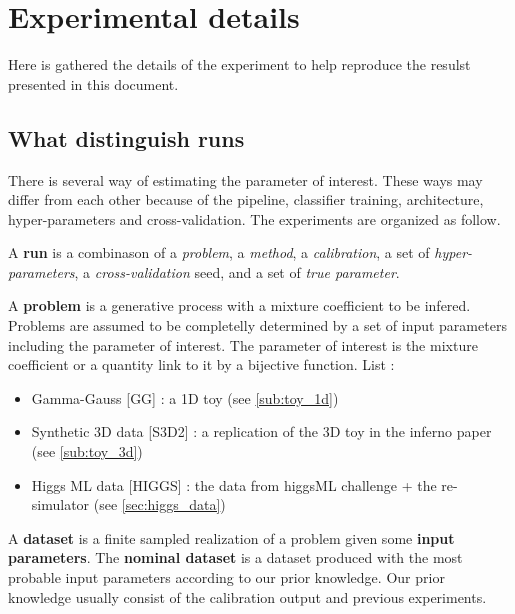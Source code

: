 \ifpdf
    \graphicspath{{Appendix1/Figs/Raster/}{Appendix1/Figs/PDF/}{Appendix1/Figs/}}
\else
    \graphicspath{{Appendix1/Figs/Vector/}{Appendix1/Figs/}}
\fi

\chapter{Experimental details} 


Here is gathered the details of the experiment to help reproduce the resulst presented in this document.








\section{What distinguish runs} %
\label{sec:what_distinguish_runs}

There is several way of estimating the parameter of interest.
These ways may differ from each other because of the pipeline, classifier training, architecture, hyper-parameters and cross-validation.
The experiments are organized as follow.

A \textbf{run} is a combinason of a \emph{problem}, a \emph{method}, a \emph{calibration}, a set of \emph{hyper-parameters}, a \emph{cross-validation} seed, and a set of \emph{true parameter}.

A \textbf{problem} is a generative process with a mixture coefficient to be infered.
Problems are assumed to be completelly determined by a set of input parameters including the parameter of interest.
The parameter of interest is the mixture coefficient or a quantity link to it by a bijective function.
List :
\begin{itemize}
	\item Gamma-Gauss [GG] : a 1D toy (see \autoref{sub:toy_1d})
	\item Synthetic 3D data [S3D2] : a replication of the 3D toy in the inferno paper (see \autoref{sub:toy_3d})
	\item Higgs ML data [HIGGS] : the data from higgsML challenge + the re-simulator (see \autoref{sec:higgs_data})
\end{itemize}

A \textbf{dataset} is a finite sampled realization of a problem given some \textbf{input parameters}.
The \textbf{nominal dataset} is a dataset produced with the most probable input parameters according to our prior knowledge.
Our prior knowledge usually consist of the calibration output and previous experiments.


